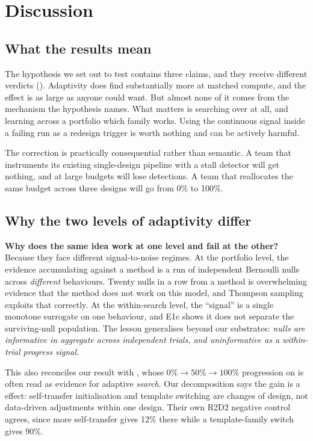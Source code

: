 \section{Discussion}
\label{sec:discussion}



\subsection{What the results mean}

The hypothesis we set out to test contains three claims, and they receive different verdicts
(). Adaptivity does find substantially more at matched compute, and the effect
is as large as anyone could want. But almost none of it comes from the mechanism the hypothesis
names. What matters is searching over \families at all, and learning across a portfolio which
family works. Using the continuous signal inside a failing run as a redesign trigger is worth
nothing and can be actively harmful.

The correction is practically consequential rather than semantic. A team that instruments its
existing single-design pipeline with a stall detector will get nothing, and at large budgets will
lose detections. A team that reallocates the same budget across three designs will go from 0\% to
100\%.

\subsection{Why the two levels of adaptivity differ}

{\bf Why does the same idea work at one level and fail at the other?} Because they face different
signal-to-noise regimes. At the portfolio level, the evidence accumulating against a method is a
run of independent Bernoulli nulls across \emph{different} behaviours. Twenty nulls in a row from a
method is overwhelming evidence that the method does not work on this model, and Thompson sampling
exploits that correctly. At the within-search level, the ``signal'' is a single monotone surrogate
on one behaviour, and E1c shows it does not separate the surviving-null population. The lesson
generalises beyond our substrates: \emph{nulls are informative in aggregate across independent
trials, and uninformative as a within-trial progress signal.}

This also reconciles our result with \citet{andriushchenko2024adaptive}, whose $0\% \to 50\% \to
100\%$ progression on \llamaseven is often read as evidence for adaptive \emph{search}. Our
decomposition says the gain is a \family effect: self-transfer initialisation and template
switching are changes of design, not data-driven adjustments within one design. Their own R2D2
negative control agrees, since more self-transfer gives 12\% there while a template-family switch
gives 90\%.

